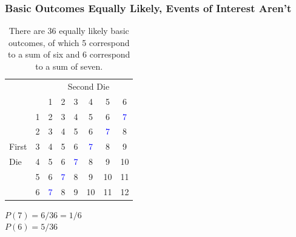 \documentclass{beamer}
\begin{document}
\begin{frame}
\frametitle{Basic Outcomes Equally Likely, Events of Interest Aren't}

\begin{table}
	\begin{tabular}{|lr|cccccc|}
	\hline
	&&\multicolumn{6}{|c|}{Second Die}\\
	&&1&2&3&4&5&6\\
	\hline
	&1&2&3&4&5&\alert{6}&\textcolor{blue}{7}\\
	&2&3&4&5&\alert{6}&\textcolor{blue}{7}&8\\
	First&3&4&5&\alert{6}&\textcolor{blue}{7}&8&9\\
	Die&4&5&\alert{6}&\textcolor{blue}{7}&8&9&10\\
	&5&\alert{6}&\textcolor{blue}{7}&8&9&10&11\\
	&6&\textcolor{blue}{7}&8&9&10&11&12\\
	\hline
	\end{tabular}
	\caption{There are 36 equally likely basic outcomes, of which 5 correspond to a sum of six and 6 correspond to a sum of  seven.}
\end{table}
	\alert{$P(7) = 6/36 = 1/6$}\\
	\alert{$P(6) = 5/36$}
\end{frame}
\end{document}
